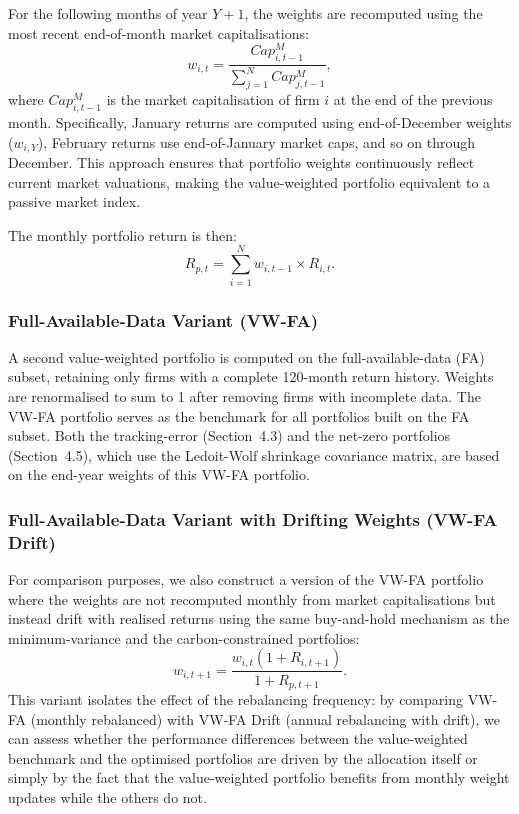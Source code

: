 \documentclass[11pt,a4paper]{article}
\begin{document}
For the following months of year \(Y+1\), the weights are recomputed using the most recent end-of-month market capitalisations:
\begin{equation}
w_{i,t} = \frac{Cap^{M}_{i,t-1}}{\sum_{j=1}^{N} Cap^{M}_{j,t-1}},
\end{equation}
where \(Cap^{M}_{i,t-1}\) is the market capitalisation of firm \(i\) at the end of the previous month. Specifically, January returns are computed using end-of-December weights (\(w_{i,Y}\)), February returns use end-of-January market caps, and so on through December. This approach ensures that portfolio weights continuously reflect current market valuations, making the value-weighted portfolio equivalent to a passive market index.

The monthly portfolio return is then:
\begin{equation}
R_{p,t} = \sum_{i=1}^{N} w_{i,t-1} \times R_{i,t}.
\end{equation}

\subsubsection{Full-Available-Data Variant (VW-FA)}

A second value-weighted portfolio is computed on the full-available-data (FA) subset, retaining only firms with a complete 120-month return history. Weights are renormalised to sum to 1 after removing firms with incomplete data. The VW-FA portfolio serves as the benchmark for all portfolios built on the FA subset. Both the tracking-error (Section~4.3) and the net-zero portfolios (Section~4.5), which use the Ledoit-Wolf shrinkage covariance matrix, are based on the end-year weights of this VW-FA portfolio.

\subsubsection{Full-Available-Data Variant with Drifting Weights (VW-FA Drift)}

For comparison purposes, we also construct a version of the VW-FA portfolio where the weights are not recomputed monthly from market capitalisations but instead drift with realised returns using the same buy-and-hold mechanism as the minimum-variance and the carbon-constrained portfolios:
\[
w_{i,t+1} = \frac{w_{i,t}(1+R_{i,t+1})}{1+R_{p,t+1}}.
\]
This variant isolates the effect of the rebalancing frequency: by comparing VW-FA (monthly rebalanced) with VW-FA Drift (annual rebalancing with drift), we can assess whether the performance differences between the value-weighted benchmark and the optimised portfolios are driven by the allocation itself or simply by the fact that the value-weighted portfolio benefits from monthly weight updates while the others do not.
\end{document}
